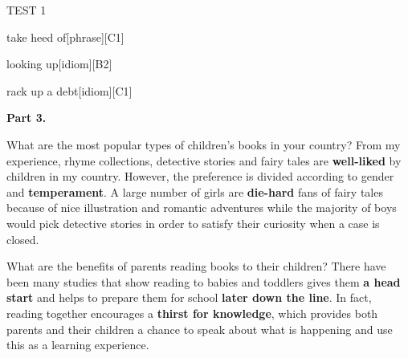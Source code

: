 \begin{glossarymc}[Cambridge 14]
\begin{test}{TEST 1}
\begin{VocabExplain}[Part 2]
            \begin{ExplainCard}{take heed of}[phrase][C1]
            \end{ExplainCard}

            \begin{ExplainCard}{looking up}[idiom][B2]
            \end{ExplainCard}

            \begin{ExplainCard}{rack up a debt}[idiom][C1]
            \end{ExplainCard}
        \end{VocabExplain}

    \noindent
    \textbf{Part 3.}
    \begin{qa}{What are the most popular types of children’s books in your country?}
    From my experience, rhyme collections, detective stories and fairy tales are \textbf{well-liked} by children in my country. However, the preference is divided according to gender and \textbf{temperament}. A large number of girls are \textbf{die-hard} fans of fairy tales because of nice illustration and romantic adventures while the majority of boys would pick detective stories in order to satisfy their curiosity when a case is closed.
    \end{qa}

    \begin{qa}{What are the benefits of parents reading books to their children?}
    There have been many studies that show reading to babies and toddlers gives them \textbf{a head start} and helps to prepare them for school \textbf{later down the line}. In fact, reading together encourages a \textbf{thirst for knowledge}, which provides both parents and their children a chance to speak about what is happening and use this as a learning experience.
    \end{qa}


\end{test}
\end{glossarymc}
